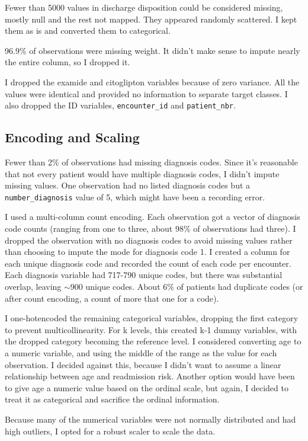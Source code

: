 \documentclass{article}      %
\begin{document}
Fewer than 5000 values in discharge disposition could be considered missing, mostly null and the rest not mapped. They appeared randomly scattered. I kept them as is and converted them to categorical. 

96.9\% of observations were missing weight. It didn't make sense to impute nearly the entire column, so I dropped it.

I dropped the examide and citoglipton variables because of zero variance. All the values were identical and provided no information to separate target classes. I also dropped the ID variables, \texttt{encounter\_id} and \texttt{patient\_nbr}.

\subsection{Encoding and Scaling}

Fewer than 2\% of observations had missing diagnosis codes. Since it's reasonable that not every patient would have multiple diagnosis codes, I didn't impute missing values. One observation had no listed diagnosis codes but a \texttt{number\_diagnosis} value of 5, which might have been a recording error.

I used a multi-column count encoding. Each observation got a vector of diagnosis code counts (ranging from one to three, about 98\% of observations had three). I dropped the observation with no diagnosis codes to avoid missing values rather than choosing to impute the mode for diagnosis code 1. I created a column for each unique diagnosis code and recorded the count of each code per encounter. Each diagnosis variable had 717-790 unique codes, but there was substantial overlap, leaving $\sim$900 unique codes. About 6\% of patients had duplicate codes (or after count encoding, a count of more that one for a code).

I one-hotencoded the remaining categorical variables, dropping the first category to prevent multicollinearity. For k levels, this created k-1 dummy variables, with the dropped category becoming the reference level. I considered converting age to a numeric variable, and using the middle of the range as the value for each observation. I decided against this, because I didn't want to assume a linear relationship between age and readmission risk. Another option would have been to give age a numeric value based on the ordinal scale, but again, I decided to treat it as categorical and sacrifice the ordinal information. 

Because many of the numerical variables were not normally distributed and had high outliers, I opted for a robust scaler to scale the data.
\end{document}
